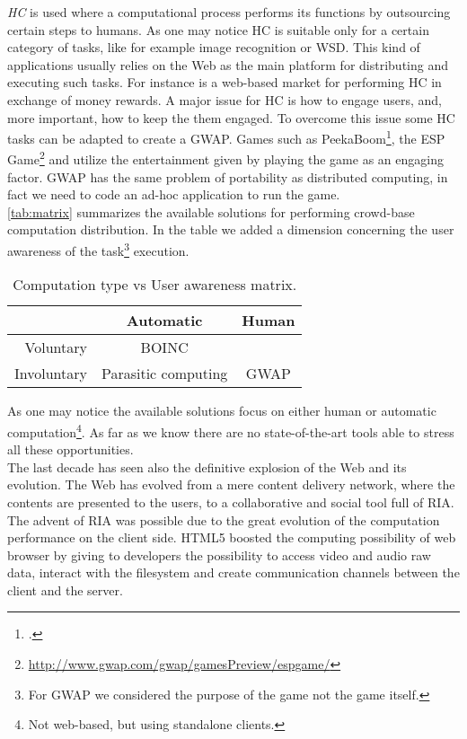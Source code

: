 \emph{\acl{HC}} is used  where a computational process performs its
functions by outsourcing certain steps to humans. As one may notice \ac{HC}
is suitable only for a certain category of tasks, like for example image
recognition or \acl{WSD}. This kind of applications usually relies on the Web
as the main platform for distributing and executing such tasks. For instance
 is a web-based market for performing \ac{HC} in exchange of
money rewards.
A major issue for \ac{HC} is how to engage users, and, more important, how to keep
the them engaged. To overcome this issue some \ac{HC} tasks can be adapted to create
a \ac{GWAP}. Games such as PeekaBoom\footcite{von2006peekaboom}, the
ESP Game\footnote{\url{http://www.gwap.com/gwap/gamesPreview/espgame/}} and
 utilize the entertainment given by playing the game as an
engaging factor. \ac{GWAP} has the same problem of portability as distributed
computing, in fact we need to code an ad-hoc application to run the game.\\



\autoref{tab:matrix} summarizes the available solutions for performing crowd-base
computation distribution. In the table we added a dimension concerning the user
awareness of the task\footnote{For \ac{GWAP} we considered the purpose of the
game not the game itself.} execution.
\begin{table}[htb]
	\caption{Computation type vs User awareness matrix.}
	\label{tab:matrix}
	\centering
	\begin{tabular}{r|c|c}
		 & \textbf{Automatic} & \textbf{Human}\\
		\hline
		Voluntary & \acs{BOINC} & \citetitle{turk}\\
		\hline
		Involuntary & Parasitic computing & \acs{GWAP}
	\end{tabular}
\end{table}
As one may notice the available solutions focus on either human or automatic
computation\footnote{Not web-based, but using standalone clients.}. As far as we
know there are no state-of-the-art tools able to stress all these opportunities.\\

The last decade has seen also the definitive explosion of the Web and its evolution.
The Web has evolved from a mere content delivery network, where the contents are
presented to the users, to a collaborative and social tool full of \ac{RIA}. The
advent of \ac{RIA} was possible due to the great evolution of the computation
performance on the client side. \acs{HTML}5 boosted the computing possibility of web
browser by giving to developers the possibility to access video and audio raw data,
interact with the filesystem and create communication channels between the client
and the server.\\


